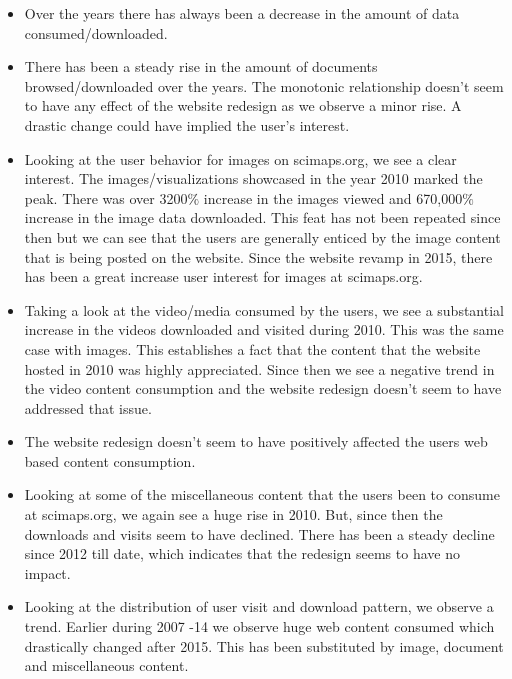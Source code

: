 \begin{itemize}
\item Over the years there has always been a decrease in the amount of data consumed/downloaded. 
\item There has been a steady rise in the amount of documents browsed/downloaded over the years. The monotonic relationship doesn’t seem to have any effect of the website redesign as we observe a minor rise. A drastic change could have implied the user’s interest. 
\item Looking at the user behavior for images on scimaps.org, we see a clear interest. The images/visualizations showcased in the year 2010 marked the peak. There was over 3200$\%$ increase in the images viewed and 670,000$\%$ increase in the image data downloaded. This feat has not been repeated since then but we can see that the users are generally enticed by the image content that is being posted on the website. Since the website revamp in 2015, there has been a great increase user interest for images at scimaps.org.
\item  Taking a look at the video/media consumed by the users, we see a substantial increase in the videos downloaded and visited during 2010. This was the same case with images. This establishes a fact that the content that the website hosted in 2010 was highly appreciated. Since then we see a negative trend in the video content consumption and the website redesign doesn’t seem to have addressed that issue.
\item The website redesign doesn’t seem to have positively affected the users web based content consumption. 
\item Looking at some of the miscellaneous content that the users been to consume at scimaps.org, we again see a huge rise in 2010. But, since then the downloads and visits seem to have declined. There has been a steady decline since 2012 till date, which indicates that the redesign seems to have no impact.
\item Looking at the distribution of user visit and download pattern, we observe a trend. Earlier during 2007 -14 we observe huge web content consumed which drastically changed after 2015. This has been substituted by image, document and miscellaneous content.
\end{itemize}
